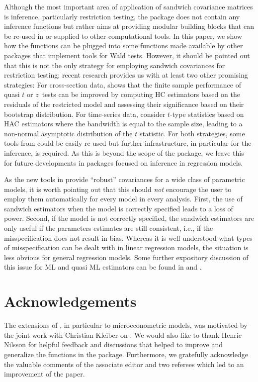 \documentclass{Z}
\begin{document}
Although the most important area of application of sandwich covariance matrices is inference,
particularly restriction testing, the package  does not contain any inference
functions but rather aims at providing modular building blocks that can be re-used in or supplied to
other computational tools. In this paper, we show how the  functions can be
plugged into some functions made available by other packages that implement tools for Wald tests.
However, it should be pointed out that this is not the only strategy for employing sandwich
covariances for restriction testing; recent research provides us with at least two other
promising strategies: For cross-section data, \cite{hac:Godfrey:2006} shows that the finite sample
performance of quasi $t$ or $z$~tests can be improved by computing HC estimators based on
the residuals of the restricted model and assessing their significance based on their bootstrap
distribution. For time-series data, \cite{hac:Kiefer+Vogelsang:2002} consider $t$-type statistics based on HAC
estimators where the bandwidth is equal to the sample size, leading to a non-normal asymptotic
distribution of the $t$ statistic. For both strategies, some tools from  could be
easily re-used but further infrastructure, in particular for the inference, is required.
As this is beyond the scope of the  package, we leave this for
future developments in packages focused on inference in regression models.

As the new tools in  provide ``robust'' covariances for a wide class of
parametric models, it is worth pointing out that this should \emph{not} encourage the
user to employ them automatically for every model in every analysis. First, the use
of sandwich estimators when the model is correctly specified leads to a loss of power.
Second, if the model is not correctly specified, the sandwich estimators are only 
useful if the parameters estimates are still consistent, i.e., if the misspecification
does not result in bias. Whereas it is well understood what types of misspecification
can be dealt with in linear regression models, the situation is less obvious for general
regression models. Some further expository discussion of this issue for ML and quasi ML
estimators can be found in \cite{hac:Freedman:2006} and \cite{hac:Koenker:2006}.



\section*{Acknowledgements}

The extensions of , in particular to microeconometric models,
was motivated by the joint work with Christian Kleiber on \cite{hac:Kleiber+Zeileis:2006}.
We would also like to thank Henric Nilsson for helpful feedback and discussions that
helped to improve and generalize the functions in the package. Furthermore,
we gratefully acknowledge the valuable comments of the associate editor and two referees
which led to an improvement of the paper.



\end{document}
